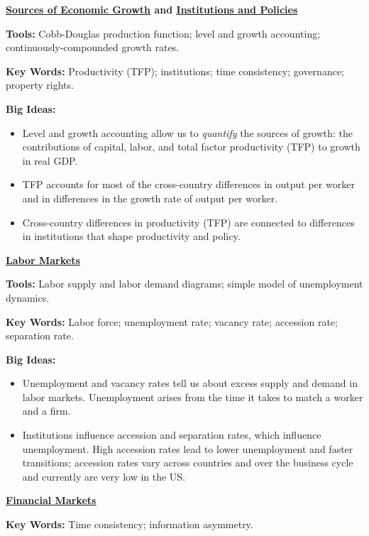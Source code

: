 \textbf{\hyperref[chp:grth]{\underline{Sources of Economic Growth}} and \hyperref[chp:insp]{\underline{Institutions and Policies}}}

\textbf{Tools:} Cobb-Douglas production function; level and growth accounting;
continuously-compounded growth rates.

\textbf{Key Words:} Productivity (TFP); institutions; time consistency; governance; property rights. 

\textbf{Big Ideas:}
\vspace{-0.1in}
\begin{itemize}
\item Level and growth accounting allow us to \emph{quantify} the sources of growth:
  the contributions of capital, labor, and total factor productivity (TFP) to growth in real GDP.
\item TFP accounts for most of the cross-country differences in output per worker 
and in differences in the growth rate of output per worker.
\item Cross-country differences in productivity (TFP)
  are connected to differences in institutions that shape productivity and policy.  
\end{itemize}


\hyperref[chp:lbmk]{\textbf{\underline{Labor Markets}}}

\textbf{Tools: }Labor supply and labor demand diagrams; simple model of unemployment dynamics.

\textbf{Key Words:} Labor force; unemployment rate; vacancy rate; accession rate; separation rate.

\textbf{Big Ideas:}
\vspace{-0.1in}
\begin{itemize}
\item Unemployment and vacancy rates tell us about excess supply and demand in labor markets. Unemployment arises from the time it takes to match a worker and a firm.

\item Institutions influence accession and separation rates, which influence unemployment. High accession rates lead to lower unemployment and faster transitions; accession rates vary across countries and over the business cycle and currently are very low in the US.
\end{itemize}

\hyperref[chp:fnmk]{\textbf{\underline{Financial Markets}}}

\textbf{Key Words:} Time consistency; information asymmetry.

